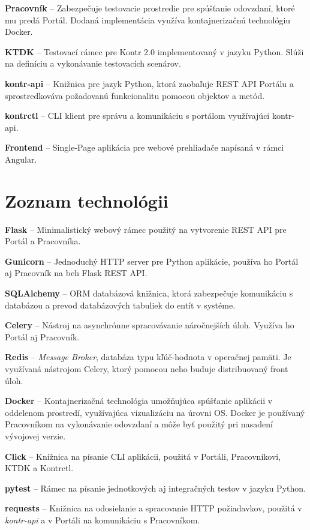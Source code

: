 \documentclass[
  digital, %
  oneside, %
  table,   %
  lof,     %
  lot,   %
]{fithesis3}
\begin{document}
\textbf{Pracovník} -- Zabezpečuje testovacie prostredie pre spúšťanie odovzdaní, ktoré mu predá Portál. Dodaná implementácia využíva kontajnerizačnú technológiu Docker.

\textbf{KTDK} -- Testovací rámec pre Kontr 2.0 implementovaný v jazyku Python. Slúži na definíciu a vykonávanie testovacích scenárov.

\textbf{kontr-api} -- Knižnica pre jazyk Python, ktorá zaobaľuje REST API Portálu a sprostredkováva požadovanú funkcionalitu pomocou objektov a metód.

\textbf{kontrctl} -- CLI klient pre správu a komunikáciu s portálom využívajúci kontr-api.

\textbf{Frontend} -- Single-Page aplikácia pre webové prehliadače napísaná v rámci Angular.



\chapter{Zoznam technológii}

\hspace{\parindent}\textbf{Flask} -- Minimalistický webový rámec použitý na vytvorenie REST API pre Portál a Pracovníka.

\textbf{Gunicorn} -- Jednoduchý HTTP server pre Python aplikácie, používa ho Portál aj Pracovník na beh Flask REST API.

\textbf{SQLAlchemy} -- ORM databázová knižnica, ktorá zabezpečuje komunikáciu s databázou a prevod databázových tabuliek do entít v systéme.

\textbf{Celery} -- Nástroj na asynchrónne spracovávanie náročnejších úloh. Využíva ho Portál aj Pracovník.

\textbf{Redis} -- \emph{Message Broker}, databáza typu kľúč-hodnota v operačnej pamäti. Je využívaná nástrojom Celery, ktorý pomocou neho buduje distribuovaný front úloh.

\textbf{Docker} -- Kontajnerizačná technológia umožňujúca spúšťanie aplikácii v oddelenom prostredí, využívajúca vizualizáciu na úrovni OS. Docker je používaný Pracovníkom na vykonávanie odovzdaní a môže byť použitý pri nasadení vývojovej verzie.

\textbf{Click} -- Knižnica na písanie CLI aplikácii, použitá v Portáli, Pracovníkovi, KTDK a Kontrctl.

\textbf{pytest} -- Rámec na písanie jednotkových aj integračných testov v jazyku Python.

\textbf{requests} -- Knižnica na odosielanie a spracovanie HTTP požiadavkov, použitá v \emph{kontr-api} a v Portáli na komunikáciu s Pracovníkom.
\end{document}
